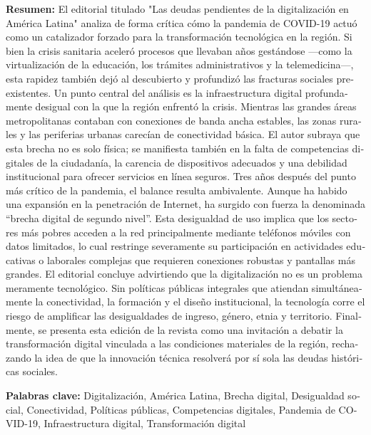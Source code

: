 \begin{tcolorbox}[colback=brown!8!white,colframe=brown!8!white,boxrule=0pt,arc=2pt,left=4pt,right=4pt,top=3pt,bottom=3pt,before skip=4pt,after skip=4pt]
\begin{otherlanguage}{spanish}
\sffamily\small \textbf{Resumen:} El editorial titulado "Las deudas pendientes de la digitalización en América Latina" analiza de forma crítica cómo la pandemia de COVID-19 actuó como un catalizador forzado para la transformación tecnológica en la región. Si bien la crisis sanitaria aceleró procesos que llevaban años gestándose —como la virtualización de la educación, los trámites administrativos y la telemedicina—, esta rapidez también dejó al descubierto y profundizó las fracturas sociales preexistentes.
Un punto central del análisis es la infraestructura digital profundamente desigual con la que la región enfrentó la crisis. Mientras las grandes áreas metropolitanas contaban con conexiones de banda ancha estables, las zonas rurales y las periferias urbanas carecían de conectividad básica. El autor subraya que esta brecha no es solo física; se manifiesta también en la falta de competencias digitales de la ciudadanía, la carencia de dispositivos adecuados y una debilidad institucional para ofrecer servicios en línea seguros.
Tres años después del punto más crítico de la pandemia, el balance resulta ambivalente. Aunque ha habido una expansión en la penetración de Internet, ha surgido con fuerza la denominada “brecha digital de segundo nivel”. Esta desigualdad de uso implica que los sectores más pobres acceden a la red principalmente mediante teléfonos móviles con datos limitados, lo cual restringe severamente su participación en actividades educativas o laborales complejas que requieren conexiones robustas y pantallas más grandes.
El editorial concluye advirtiendo que la digitalización no es un problema meramente tecnológico. Sin políticas públicas integrales que atiendan simultáneamente la conectividad, la formación y el diseño institucional, la tecnología corre el riesgo de amplificar las desigualdades de ingreso, género, etnia y territorio. Finalmente, se presenta esta edición de la revista como una invitación a debatir la transformación digital vinculada a las condiciones materiales de la región, rechazando la idea de que la innovación técnica resolverá por sí sola las deudas históricas sociales.
\par\smallskip\noindent\textbf{Palabras clave:} Digitalización, América Latina, Brecha digital, Desigualdad social, Conectividad, Políticas públicas, Competencias digitales, Pandemia de COVID-19, Infraestructura digital, Transformación digital
\end{otherlanguage}
\end{tcolorbox}

